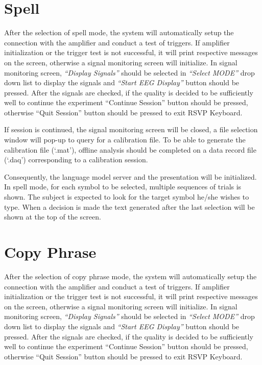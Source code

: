 \documentclass[12pt,letterpaper]{report}
\begin{document}
\section{Spell}
After the selection of spell mode, the system will automatically setup the connection with the amplifier and conduct a test of triggers. If amplifier initialization or the trigger test is not successful, it will print respective messages on the screen, otherwise a signal monitoring screen will initialize. In signal monitoring screen, \textit{``Display Signals''} should be selected in \textit{``Select MODE''} drop down list to display the signals and \textit{``Start EEG Display''} button should be pressed. After the signals are checked, if the quality is decided to be sufficiently well to continue the experiment ``Continue Session'' button should be pressed, otherwise ``Quit Session'' button should be pressed to exit RSVP Keyboard\texttrademark .

If session is continued, the signal monitoring screen will be closed, a file selection window will pop-up to query for a calibration file. To be able to generate the calibration file (`.mat'), offline analysis should be completed on a data record file (`.daq') corresponding to a calibration session. 

Consequently, the language model server and the presentation will be initialized. In spell mode, for each symbol to be selected, multiple sequences of trials is shown. The subject is expected to look for the target symbol he/she wishes to type. When a decision is made the text generated after the last selection will be shown at the top of the screen.

\section{Copy Phrase} 
After the selection of copy phrase mode, the system will automatically setup the connection with the amplifier and conduct a test of triggers. If amplifier initialization or the trigger test is not successful, it will print respective messages on the screen, otherwise a signal monitoring screen will initialize. In signal monitoring screen, \textit{``Display Signals''} should be selected in \textit{``Select MODE''} drop down list to display the signals and \textit{``Start EEG Display''} button should be pressed. After the signals are checked, if the quality is decided to be sufficiently well to continue the experiment ``Continue Session'' button should be pressed, otherwise ``Quit Session'' button should be pressed to exit RSVP Keyboard\texttrademark .
\end{document}
